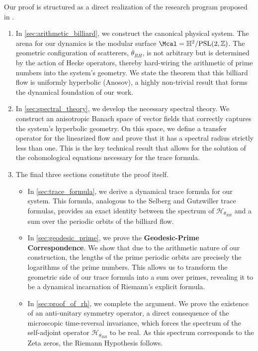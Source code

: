 \documentclass[12pt, letterpaper]{amsart}
\theoremstyle{plain}
\theoremstyle{definition}
\theoremstyle{remark}
\newcommand{\PSL}{\mathrm{PSL}}
\newcommand{\Z}{\mathbb{Z}}
\newcommand{\Hyp}{\mathbb{H}^2}
\begin{document}
Our proof is structured as a direct realization of the research program proposed in \cite{Qi2025-Strategy}.
\begin{enumerate}
    \item[\textbf{Part I (The Model):}] In \cref{sec:arithmetic_billiard}, we construct the canonical physical system. The arena for our dynamics is the modular surface $\Mcal = \Hyp/\PSL(2,\Z)$. The geometric configuration of scatterers, $\theta_{RH}$, is not arbitrary but is determined by the action of Hecke operators, thereby hard-wiring the arithmetic of prime numbers into the system's geometry. We state the theorem that this billiard flow is uniformly hyperbolic (Anosov), a highly non-trivial result that forms the dynamical foundation of our work.

    \item[\textbf{Part II (The Analytic Machinery):}] In \cref{sec:spectral_theory}, we develop the necessary spectral theory. We construct an anisotropic Banach space of vector fields that correctly captures the system's hyperbolic geometry. On this space, we define a transfer operator for the linearized flow and prove that it has a spectral radius strictly less than one. This is the key technical result that allows for the solution of the cohomological equations necessary for the trace formula.

    \item[\textbf{Part III (The Proof):}] The final three sections constitute the proof itself.
    \begin{itemize}
        \item In \cref{sec:trace_formula}, we derive a dynamical trace formula for our system. This formula, analogous to the Selberg and Gutzwiller trace formulas, provides an exact identity between the spectrum of $\mathcal{H}_{\theta_{RH}}$ and a sum over the periodic orbits of the billiard flow.
        \item In \cref{sec:geodesic_prime}, we prove the \textbf{Geodesic-Prime Correspondence}. We show that due to the arithmetic nature of our construction, the lengths of the prime periodic orbits are precisely the logarithms of the prime numbers. This allows us to transform the geometric side of our trace formula into a sum over primes, revealing it to be a dynamical incarnation of Riemann's explicit formula.
        \item In \cref{sec:proof_of_rh}, we complete the argument. We prove the existence of an anti-unitary symmetry operator, a direct consequence of the microscopic time-reversal invariance, which forces the spectrum of the self-adjoint operator $\mathcal{H}_{\theta_{RH}}$ to be real. As this spectrum corresponds to the Zeta zeros, the Riemann Hypothesis follows.
    \end{itemize}
\end{enumerate}
\end{document}
